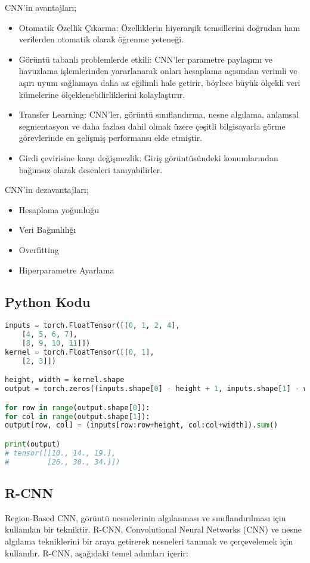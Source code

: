 CNN'in avantajları;
\begin{itemize}
	\item Otomatik Özellik Çıkarma: Özelliklerin hiyerarşik temsillerini doğrudan ham verilerden otomatik olarak öğrenme yeteneği.
	\item Görüntü tabanlı problemlerde etkili: CNN'ler parametre paylaşımı ve havuzlama işlemlerinden yararlanarak onları hesaplama açısından verimli ve aşırı uyum sağlamaya daha az eğilimli hale getirir, böylece büyük ölçekli veri kümelerine ölçeklenebilirliklerini kolaylaştırır.
	\item Transfer Learning: CNN'ler, görüntü sınıflandırma, nesne algılama, anlamsal segmentasyon ve daha fazlası dahil olmak üzere çeşitli bilgisayarla görme görevlerinde en gelişmiş performansı elde etmiştir.
	\item Girdi çevirisine karşı değişmezlik: Giriş görüntüsündeki konumlarından bağımsız olarak desenleri tanıyabilirler.
\end{itemize}

CNN'in dezavantajları;
\begin{itemize}
	\item Hesaplama yoğunluğu
	\item Veri Bağımlılığı
	\item Overfitting
	\item Hiperparametre Ayarlama
\end{itemize}

\subsection{Python Kodu}

\begin{lstlisting}[language=Python]
inputs = torch.FloatTensor([[0, 1, 2, 4],
    [4, 5, 6, 7],
    [8, 9, 10, 11]])
kernel = torch.FloatTensor([[0, 1],
    [2, 3]])

height, width = kernel.shape
output = torch.zeros((inputs.shape[0] - height + 1, inputs.shape[1] - width + 1))

for row in range(output.shape[0]):
for col in range(output.shape[1]):
output[row, col] = (inputs[row:row+height, col:col+width]).sum()

print(output)
# tensor([[10., 14., 19.],
#         [26., 30., 34.]])
\end{lstlisting}

\subsection{R-CNN}
Region-Based CNN, görüntü nesnelerinin algılanması ve sınıflandırılması için kullanılan bir tekniktir. R-CNN, Convolutional Neural Networks (CNN) ve nesne algılama tekniklerini bir araya getirerek nesneleri tanımak ve çerçevelemek için kullanılır. R-CNN, aşağıdaki temel adımları içerir:


